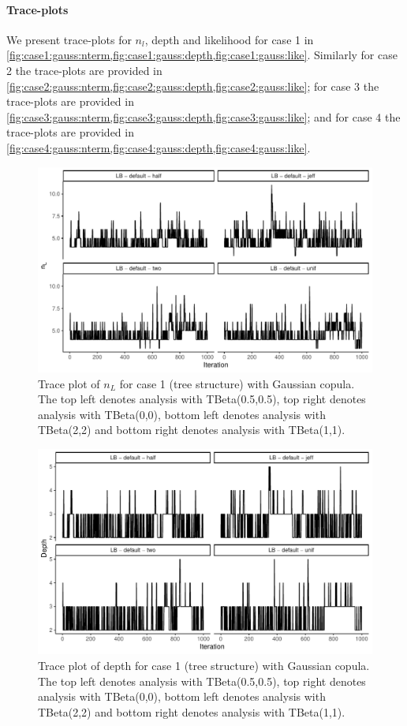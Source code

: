 \documentclass{amsart}
\begin{document}
\paragraph{Trace-plots} We present trace-plots for $n_l$, depth and likelihood for case 1 in \cref{fig:case1:gauss:nterm,fig:case1:gauss:depth,fig:case1:gauss:like}. Similarly for case 2 the trace-plots are provided in \cref{fig:case2:gauss:nterm,fig:case2:gauss:depth,fig:case2:gauss:like}; for case 3 the trace-plots are provided in \cref{fig:case3:gauss:nterm,fig:case3:gauss:depth,fig:case3:gauss:like}; and for case 4 the trace-plots are provided in \cref{fig:case4:gauss:nterm,fig:case4:gauss:depth,fig:case4:gauss:like}.



\begin{figure}
	\centering
	\includegraphics[width = 0.75\linewidth]{trace_case1_gauss_nterm.pdf}
	\caption{Trace plot of $n_L$ for case 1 (tree structure) with Gaussian copula. The top left denotes analysis with TBeta(0.5,0.5), top right denotes analysis with TBeta(0,0), bottom left denotes analysis with TBeta(2,2) and bottom right denotes analysis with TBeta(1,1).}
	\label{fig:case1:gauss:nterm}
\end{figure}

\begin{figure}
	\centering
	\includegraphics[width = 0.75\linewidth]{trace_case1_gauss_depth.pdf}
	\caption{Trace plot of depth for case 1 (tree structure) with Gaussian copula. The top left denotes analysis with TBeta(0.5,0.5), top right denotes analysis with TBeta(0,0), bottom left denotes analysis with TBeta(2,2) and bottom right denotes analysis with TBeta(1,1).}
	\label{fig:case1:gauss:depth}
\end{figure}
\end{document}
